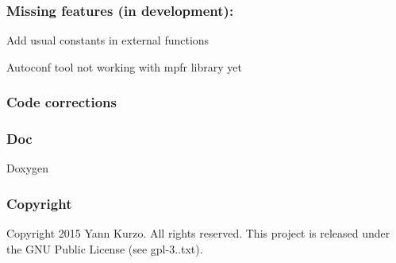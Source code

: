 \subsubsection*{Missing features (in development)\+:}


\begin{DoxyItemize}
\item Add usual constants in external functions
\item Autoconf tool not working with mpfr library yet
\end{DoxyItemize}

\subsubsection*{Code corrections}

\subsubsection*{Doc}


\begin{DoxyItemize}
\item Doxygen
\end{DoxyItemize}

\subsubsection*{Copyright}

Copyright 2015 Yann Kurzo. All rights reserved. This project is released under the G\+N\+U Public License (see gpl-\/3..\+txt). 